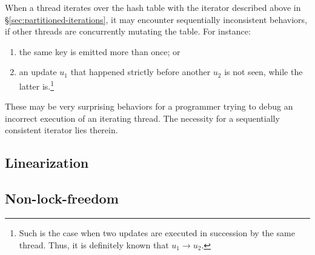 When a thread iterates over the hash table with the iterator described above in \S\ref{sec:partitioned-iterations}, it may encounter sequentially inconsistent behaviors, if other threads are concurrently mutating the table.
For instance:
\begin{enumerate}
	\item the same key is emitted more than once; or
	\item an update $u_1$ that happened strictly before another $u_2$ is not seen, while the latter is.\footnote{%
		Such is the case when two updates are executed in succession by the same thread.
		Thus, it is definitely known that $u_1 \rightarrow u_2$.
	}
\end{enumerate}

These may be very surprising behaviors for a programmer trying to debug an incorrect execution of an iterating thread.
The necessity for a sequentially consistent iterator lies therein.

\subsection{Linearization}
\subsection{Non-lock-freedom}
